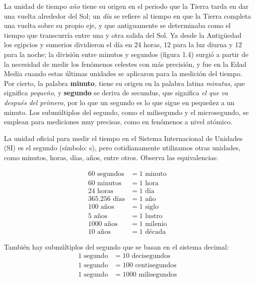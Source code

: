 \documentclass[11pt]{book}
\begin{document}
La unidad de tiempo \emph{año} tiene su origen en el periodo que la Tierra tarda
en dar una vuelta alrededor del Sol; un \emph{d\'ia}
se refiere al tiempo en que la Tierra completa una vuelta sobre su propio eje,
y que antiguamente se determinaba como el tiempo
que transcurr\'ia entre una y otra salida del Sol. Ya desde la Antigüedad los
egipcios y sumerios dividieron el d\'ia en 24 horas,
12 para la luz diurna y 12 para la noche; la divisi\'on entre minutos y segundos
(figura 1.4) surgi\'o a partir de la necesidad
de medir los fen\'omenos celestes con m\'as precisi\'on, y fue en la Edad Media
cuando estas \'ultimas unidades se aplicaron para la
medici\'on del tiempo. Por cierto, la palabra \textbf{minuto}, tiene su origen en
la palabra latina \emph{minutus}, que significa \emph{pequeño},
y \textbf{segundo} se deriva de secundus, que significa \emph{el que va despu\'es del
    primero}, por lo que un segundo  es lo que
sigue en pequeñez a un minuto. Los subm\'ultiplos del segundo, como el
milisegundo y el microsegundo, se emplean para mediciones
muy precisas, como en fen\'omenos a nivel at\'omico.

La unidad oficial para medir el tiempo en el Sistema Internacional de Unidades
(SI) es el segundo (s\'imbolo: s), pero
cotidianamente utilizamos otras unidades, como minutos, horas, d\'ias, años,
entre otros. Observa las equivalencias:

\begin{minipage}[b]{0.5\linewidth}
    \begin{align*}
        60 \text{ segundos}    & = 1 \text{ minuto}   \\
        60 \text{ minutos}     & = 1 \text{ hora}     \\
        24 \text{ horas}       & = 1 \text{ d\'ia}    \\
        365.256 \text{ d\'ias} & = 1 \text{ año}      \\
        100 \text{ años}       & = 1 \text{ siglo}    \\
        5 \text{ años}         & = 1 \text{ lustro}   \\
        1 000 \text{ años}     & = 1 \text{ milenio}  \\
        10 \text{ años}        & = 1 \text{ d\'ecada}
    \end{align*}
\end{minipage}%
\begin{minipage}[b]{0.5\linewidth}
    Tambi\'en hay subm\'ultiplos del segundo que se basan en el sistema decimal:
    \begin{align*}
        1 \text{ segundo} & = 10   \text{ decisegundos}  \\
        1 \text{ segundo} & = 100  \text{ centisegundos} \\
        1 \text{ segundo} & = 1000 \text{ milisegundos}
    \end{align*}
\end{minipage}
\end{document}

